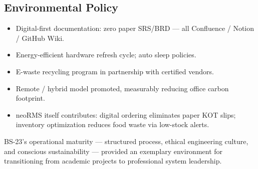 \subsection{Environmental Policy}
\begin{itemize}
\item Digital-first documentation: zero paper SRS/BRD --- all Confluence / Notion / GitHub Wiki.
\item Energy-efficient hardware refresh cycle; auto sleep policies.
\item E-waste recycling program in partnership with certified vendors.
\item Remote / hybrid model promoted, measurably reducing office carbon footprint.
\item neoRMS itself contributes: digital ordering eliminates paper KOT slips; inventory optimization reduces food waste via low-stock alerts.
\end{itemize}

BS-23's operational maturity --- structured process, ethical engineering culture, and conscious sustainability --- provided an exemplary environment for transitioning from academic projects to professional system leadership.
